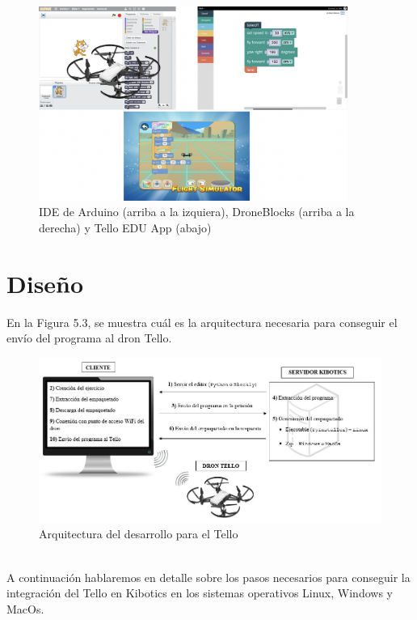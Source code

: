 \documentclass{report}
\begin{document}
\begin{figure}[h!]
  \centering
    \includegraphics[width=0.9\textwidth]{images/software_tello_ide.png}
  \caption{IDE de Arduino (arriba a la izquiera), DroneBlocks (arriba a la derecha) y Tello EDU App (abajo)}
  \label{IDE de Arduino, DroneBlocks y Tello EDU App}
\end{figure}

\section{Diseño}

En la Figura 5.3, se muestra cuál es la arquitectura necesaria para conseguir el envío del programa al dron Tello.
\\
\begin{figure}[h!]
  \centering
    \includegraphics[width=1\textwidth]{images/infraestructura_tello.png}
  \caption{Arquitectura del desarrollo para el Tello}
  \label{Arquitectura del desarrollo para el Tello}
\end{figure}
\\
A continuación hablaremos en detalle sobre los pasos necesarios para conseguir la integración del Tello en Kibotics en los sistemas operativos Linux, Windows y MacOs.
\end{document}
